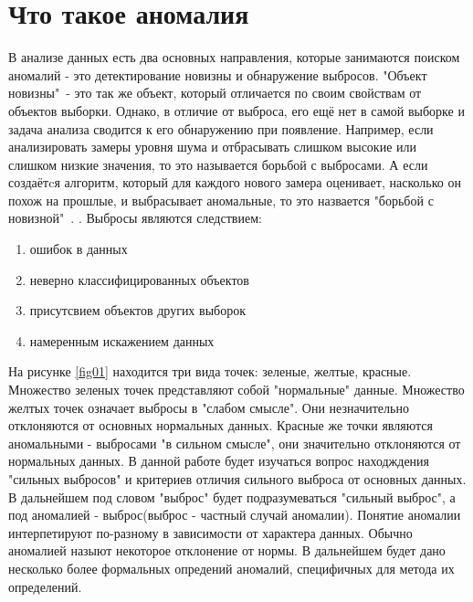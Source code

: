 \section{Что такое аномалия}
В анализе данных есть два основных направления, которые занимаются поиском аномалий - это детектирование новизны и обнаружение выбросов. "Объект новизны"\ - это так же объект, который отличается по своим свойствам от объектов  выборки. Однако, в отличие от выброса,  его ещё нет в самой выборке и задача анализа сводится к его обнаружению при появление. Например, если анализировать замеры уровня шума и отбрасывать слишком высокие или слишком низкие значения, то это называется борьбой с выбросами. А если  создаётcя алгоритм, который для каждого нового замера оценивает, насколько он похож на прошлые, и выбрасывает аномальные, то это  назвается "борьбой с новизной"\ .
\cite{Book01}.
Выбросы являются следствием:
\begin{enumerate}
	\item ошибок в данных
	\item неверно классифицированных объектов
	\item присутсвием объектов других выборок
	\item намеренным искажением данных
\end{enumerate}
На рисунке \ref{fig01} находится три вида точек: зеленые, желтые, красные. Множество зеленых точек представляют собой "нормальные" данные. Множество желтых точек означает  выбросы в "слабом смысле". Они незначительно отклоняются от основных  нормальных данных. Красные же точки являются аномальными - выбросами "в сильном смысле", они значительно  отклоняются  от нормальных данных. В данной работе будет изучаться вопрос находждения "сильных выбросов" и  критериев отличия сильного выброса от основных данных. В дальнейшем под словом "выброс" будет подразумеваться "сильный выброс",  а под  аномалией -  выброс(выброс - частный случай аномалии).
Понятие аномалии  интерпетируют по-разному в зависимости от характера данных. Обычно аномалией назыют некоторое отклонение от нормы. В дальнейшем будет дано несколько более формальных опредений аномалий, специфичных для метода их определений.

